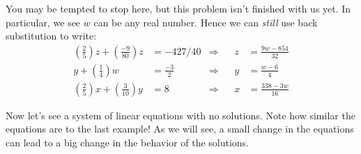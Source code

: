 \documentclass{ximera}
\begin{document}
\begin{example}
\begin{explanation}
You may be tempted to stop here, but this problem isn't finished with
us yet. In particular, we see $w$ can be any real number. Hence we can
\textit{still} use back substitution to write:
\begin{align*}
 \left(\frac{2}{5}\right) z + \left(\frac{-9}{80}\right)z  &= -427/40   &\Rightarrow & & z &= \frac{9 w-854}{32} \\
  y+\left(\frac{1}{4}\right)w &=\frac{-3}{2} &\Rightarrow & & y &= \frac{w-6}{4}\\
  \left(\frac{2}{5}\right)x  +  \left(\frac{3}{10}\right)y  &= 8 &\Rightarrow & & x &= \frac{338-3w}{16}
\end{align*}
\end{explanation}
\end{example}

Now let's see a system of linear equations with no solutions. Note how similar the equations are to the last example! As we will see, a small change in the equations can lead to a big change in the behavior of the solutions.
\end{document}
